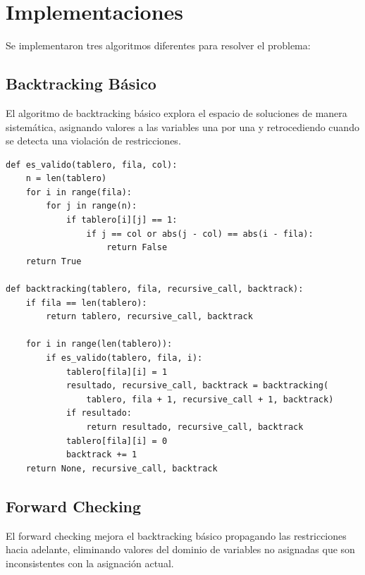 \documentclass[12pt,a4paper]{article}
\begin{document}
\section{Implementaciones}

Se implementaron tres algoritmos diferentes para resolver el problema:

\subsection{Backtracking Básico}

El algoritmo de backtracking básico explora el espacio de soluciones de manera sistemática, asignando valores a las variables una por una y retrocediendo cuando se detecta una violación de restricciones.

\begin{lstlisting}[caption=Implementación de Backtracking Básico]
def es_valido(tablero, fila, col):
    n = len(tablero)
    for i in range(fila):
        for j in range(n):
            if tablero[i][j] == 1:
                if j == col or abs(j - col) == abs(i - fila):
                    return False
    return True

def backtracking(tablero, fila, recursive_call, backtrack):
    if fila == len(tablero):
        return tablero, recursive_call, backtrack 
    
    for i in range(len(tablero)):
        if es_valido(tablero, fila, i):
            tablero[fila][i] = 1
            resultado, recursive_call, backtrack = backtracking(
                tablero, fila + 1, recursive_call + 1, backtrack)
            if resultado:
                return resultado, recursive_call, backtrack
            tablero[fila][i] = 0
            backtrack += 1
    return None, recursive_call, backtrack
\end{lstlisting}
\newpage
\subsection{Forward Checking}

El forward checking mejora el backtracking básico propagando las restricciones hacia adelante, eliminando valores del dominio de variables no asignadas que son inconsistentes con la asignación actual.
\end{document}
